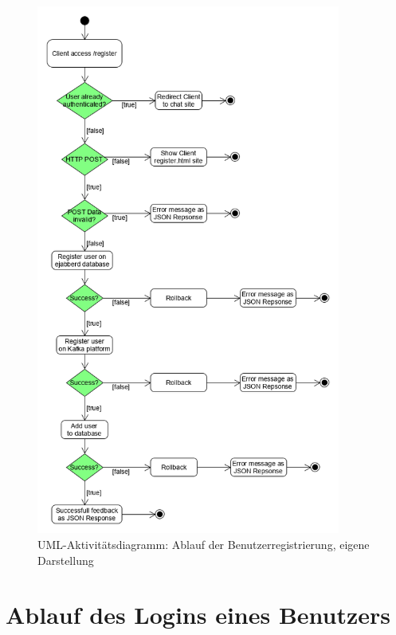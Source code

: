 \documentclass[a4paper,titlepage,halfparskip,12pt]{scrreprt}
\begin{document}
\begin{figure}[h]
	\centering
	\includegraphics[height=17.5cm]{images/umlRegistration}
	\caption{\acs{UML}-Aktivitätsdiagramm: Ablauf der Benutzerregistrierung, eigene Darstellung}
	\label{img:umlActivityRegistration}
\end{figure}

\pagebreak

\section{Ablauf des Logins eines Benutzers}
\end{document}
